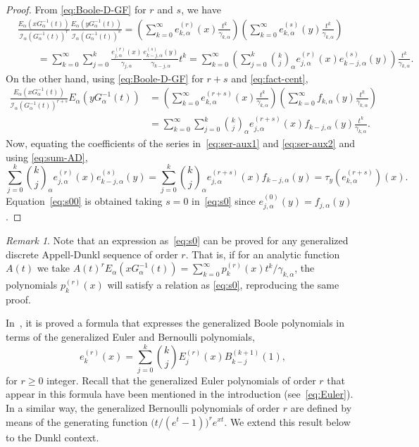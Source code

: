 \documentclass[11pt]{article}
\theoremstyle{plain}
\theoremstyle{remark}
\newtheorem{remark}[theorem]{Remark}
\numberwithin{equation}{section} %
\newcommand{\Ea}{E_{\alpha}}
\newcommand{\binoma}[2]{\binom{#1}{#2}_{\!\alpha}}
\newcommand{\I}{\mathcal{I}}
\begin{document}
\begin{proof}
From \eqref{eq:Boole-D-GF} for $r$ and $s$, we have
\begin{align}
\nonumber
  &\frac{\Ea(xG_{\alpha}^{-1}(t))}{\I_{\alpha}(G_{\alpha}^{-1}(t))^r}
  \frac{\Ea(yG_{\alpha}^{-1}(t))}{\I_{\alpha}(G_{\alpha}^{-1}(t))^s}
  = \left(\sum_{k=0}^{\infty} e_{k,\alpha}^{(r)}(x) \frac{t^k}{\gamma_{k,\alpha}}\right)
  \left(\sum_{k=0}^{\infty} e_{k,\alpha}^{(s)}(y) \frac{t^k}{\gamma_{k,\alpha}}\right) \\
\label{eq:ser-aux1}
  &\qquad = \sum_{k=0}^{\infty} \sum_{j=0}^k \frac{e_{j,\alpha}^{(r)}(x)}{\gamma_{j,\alpha}}
  \frac{e_{k-j,\alpha}^{(s)}(y)}{\gamma_{k-j,\alpha}}t^k
  = \sum_{k=0}^{\infty} \left(\sum_{j=0}^k \binoma{k}{j} e_{j,\alpha}^{(r)}(x)e_{k-j,\alpha}^{(s)}(y)\right)
  \frac{t^k}{\gamma_{k,\alpha}}.
\end{align}
On the other hand, using \eqref{eq:Boole-D-GF} for $r+s$ and \eqref{eq:fact-cent}, 
\begin{align}
\nonumber
  \frac{\Ea(xG_{\alpha}^{-1}(t))}{\I_{\alpha}(G_{\alpha}^{-1}(t))^{r+s}} \Ea(yG_{\alpha}^{-1}(t))
  &= \left(\sum_{k=0}^{\infty} e_{k,\alpha}^{(r+s)}(x) \frac{t^k}{\gamma_{k,\alpha}}\right)
  \left(\sum_{k=0}^{\infty} f_{k,\alpha}(y) \frac{t^k}{\gamma_{k,\alpha}}\right) \\
\label{eq:ser-aux2}
  &= \sum_{k=0}^{\infty} \sum_{j=0}^k \binoma{k}{j} e_{j,\alpha}^{(r+s)}(x) f_{k-j,\alpha}(y)
  \frac{t^k}{\gamma_{k,\alpha}}.
\end{align}
Now, equating the coefficients of the series in~\eqref{eq:ser-aux1} and \eqref{eq:ser-aux2} and using \eqref{eq:sum-AD},
\[
  \sum_{j=0}^k \binoma{k}{j} e_{j,\alpha}^{(r)}(x) e_{k-j,\alpha}^{(s)}(y)
  = \sum_{j=0}^k \binoma{k}{j} e_{j,\alpha}^{(r+s)}(x) f_{k-j,\alpha}(y)
  = \tau_y(e_{k,\alpha}^{(r+s)})(x).
\]
Equation~\eqref{eq:s00} is obtained taking $s=0$ in~\eqref{eq:s0} since $e_{j,\alpha}^{(0)}(y)=f_{j,\alpha}(y)$.
\end{proof}

\begin{remark}
Note that an expression as~\eqref{eq:s0} can be proved for any generalized discrete Appell-Dunkl sequence of order $r$. That is, if for an analytic function $A(t)$ we take $A(t)^r \Ea(xG_\alpha^{-1}(t)) = \sum_{k=0}^{\infty} p_k^{(r)}(x) t^k/\gamma_{k,\alpha}$, the polynomials $p_k^{(r)}(x)$ will satisfy a relation as \eqref{eq:s0}, reproducing the same proof.
\end{remark}

In~\cite[(3.18)]{Car}, it is proved a formula that expresses the generalized Boole polynomials in terms of the generalized Euler and Bernoulli polynomials,
\[
e_k^{(r)}(x) = \sum_{j=0}^k \binom{k}{j}E_j^{(r)}(x)B_{k-j}^{(k+1)}(1),
\]
for $r\ge 0$ integer. Recall that the generalized Euler polynomials of order $r$ that appear in this formula have been mentioned in the introduction (see~\eqref{eq:Euler}). In a similar way, the generalized Bernoulli polynomials of order $r$ are defined by means of the generating function $\big(t/(e^t-1)\big)^re^{xt}$. We extend this result below to the Dunkl context.
\end{document}
